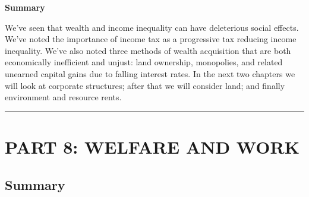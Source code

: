 \documentclass[]{tufte-handout}
\begin{document}
\textbf{Summary}

We've seen that wealth and income inequality can have deleterious social
effects. We've noted the importance of income tax as a progressive tax
reducing income inequality. We've also noted three methods of wealth
acquisition that are both economically inefficient and unjust: land
ownership, monopolies, and related unearned capital gains due to falling
interest rates. In the next two chapters we will look at corporate
structures; after that we will consider land; and finally environment
and resource rents.

\begin{center}\rule{0.5\linewidth}{\linethickness}\end{center}

\newpage

\hypertarget{part-8-welfare-and-work}{%
\section{PART 8: WELFARE AND WORK}\label{part-8-welfare-and-work}}

\hypertarget{summary-1}{%
\subsection{Summary}\label{summary-1}}
\end{document}
